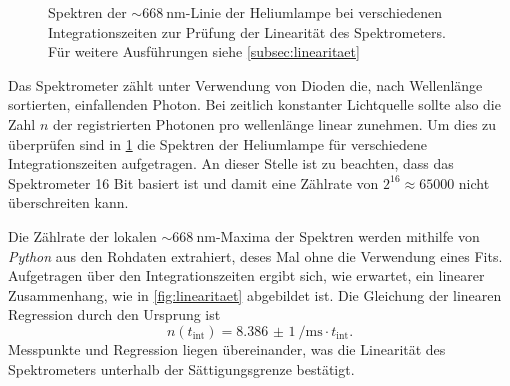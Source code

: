 \documentclass[../bericht.tex]{subfiles}
\begin{document}
\begin{figure}[tb]
          \caption[Spektren der $\sim\SI{668}{\nano\meter}$-Linie der Heliumlampe bei verschiedenen Integrationszeiten zur Prüfung der Linearität des Spektrometers.]{Spektren der $\sim\SI{668}{\nano\meter}$-Linie der Heliumlampe bei verschiedenen Integrationszeiten zur Prüfung der Linearität des Spektrometers. Für weitere Ausführungen siehe \cref{subsec:linearitaet}}
          \label{fig:linearity}
        \end{figure}

        Das Spektrometer zählt unter Verwendung von Dioden die, nach Wellenlänge sortierten, einfallenden Photon. Bei zeitlich konstanter Lichtquelle sollte also die Zahl $n$ der registrierten Photonen pro wellenlänge linear zunehmen. Um dies zu überprüfen sind in \cref{fig:linearity} die Spektren der Heliumlampe für verschiedene Integrationszeiten aufgetragen. An dieser Stelle ist zu beachten, dass das Spektrometer 16 Bit basiert ist und damit eine Zählrate von $2^{16}\approx 65000$ nicht überschreiten kann.

        Die Zählrate der lokalen $\sim\SI{668}{\nano\meter}$-Maxima der Spektren werden mithilfe von \textit{Python} aus den Rohdaten extrahiert, deses Mal ohne die Verwendung eines Fits. Aufgetragen über den Integrationszeiten ergibt sich, wie erwartet, ein linearer Zusammenhang, wie in \cref{fig:linearitaet} abgebildet ist. Die Gleichung der linearen Regression durch den Ursprung ist
        \begin{equation}
          n(t_\mathrm{int})=\SI{8,386(1)}{\per\milli\second} \cdot t_\mathrm{int}.
          \label{eq:linear-fit}
        \end{equation}
        Messpunkte und Regression liegen übereinander, was die Linearität des Spektrometers unterhalb der Sättigungsgrenze bestätigt.
\end{document}
